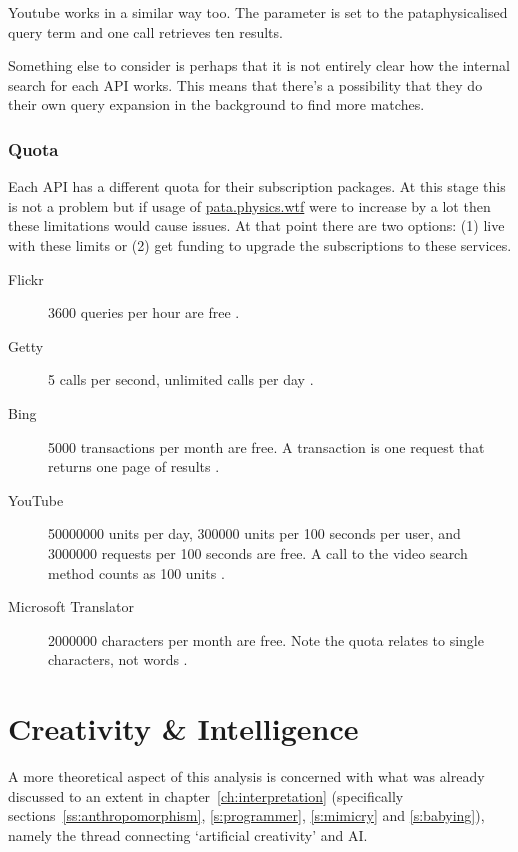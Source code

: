 Youtube works in a similar way too. The  parameter is set to the pataphysicalised query term and one call retrieves ten results.

Something else to consider is perhaps that it is not entirely clear how the internal search for each \ac{API} works. This means that there's a possibility that they do their own query expansion in the background to find more matches.


\subsubsection{Quota}
\label{s:quota}

Each \ac{API} has a different quota for their subscription packages. At this stage this is not a problem but if usage of \url{pata.physics.wtf} were to increase by a lot then these limitations would cause issues. At that point there are two options: (1) live with these limits or (2) get funding to upgrade the subscriptions to these services.

\begin{description}
  \item[Flickr] \num{3600} queries per hour are free \autocite{FlickrGuideAPI}.
  \item[Getty] \num{5} calls per second, unlimited calls per day \autocite{GettyOverviewAPI}.
  \item[Bing] \num{5000} transactions per month are free. A transaction is one request that returns one page of results \autocite{BingAzureAPI}.
  \item[YouTube] \num{50000000} units per day, \num{300000} units per \num{100} seconds per user, and \num{3000000} requests per \num{100} seconds are free. A call to the video search method counts as \num{100} units \autocite{YouTubeAPI}.
  \item[Microsoft Translator] \num{2000000} characters per month are free. Note the quota relates to single characters, not words \autocite{TranslatorAPI}.
\end{description}


\section{Creativity \& Intelligence}

A more theoretical aspect of this analysis is concerned with what was already discussed to an extent in chapter~\ref{ch:interpretation} (specifically sections~\ref{ss:anthropomorphism}, \ref{s:programmer}, \ref{s:mimicry} and \ref{s:babying}), namely the thread connecting `artificial creativity' and \acl{AI}.

